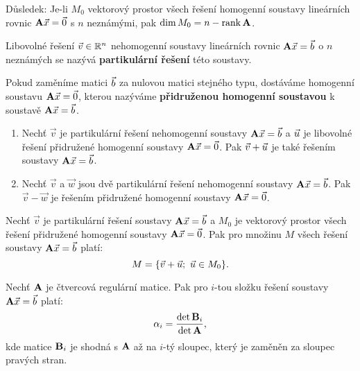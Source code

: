Důsledek: Je-li $M_0$ vektorový prostor všech řešení homogenní soustavy lineárních rovnic $\mathbf{A}\vec{x}=\vec{0}$ s $n$ neznámými, pak $\dim M_0=n-\operatorname{rank}\mathbf{A}$.
  
\begin{df}
Libovolné řešení $\vec v\in\mathbb R^n$ nehomogenní soustavy lineárních rovnic $\mathbf{A}\vec{x}=\vec{b}$ o $n$ neznámých se nazývá {\bf partikulární řešení} této soustavy.

Pokud zaměníme matici $\vec{b}$ za nulovou matici stejného typu, dostáváme homogenní soustavu $\mathbf{A}\vec{x}=\vec{0}$, kterou nazýváme {\bf přidruženou homogenní soustavou} k soustavě $\mathbf{A}\vec{x}=\vec{b}$.
\end{df}
  
\begin{veta}
\begin{enumerate}
\item Nechť $\vec v$ je partikulární řešení nehomogenní soustavy $\mathbf{A}\vec{x}=\vec{b}$ a $\vec{u}$ je libovolné řešení přidružené homogenní soustavy $\mathbf{A}\vec{x}=\vec{0}$.
Pak $\vec v+\vec{u}$ je také řešením soustavy $\mathbf{A}\vec{x}=\vec{b}$.
\item Nechť $\vec v$ a $\vec w$ jsou dvě partikulární řešení nehomogenní soustavy $\mathbf{A}\vec{x}=\vec{b}$.
Pak $\vec v-\vec w$ je řešením přidružené homogenní soustavy $\mathbf{A}\vec{x}=\vec{0}$.
\end{enumerate}
\end{veta}
  
\begin{veta}
Nechť $\vec v$ je partikulární řešení soustavy $\mathbf{A}\vec{x}=\vec{b}$ a $M_0$ je vektorový prostor všech řešení přidružené homogenní soustavy $\mathbf{A}\vec{x}=\vec{0}$.
Pak pro množinu $M$ všech řešení soustavy $\mathbf{A}\vec{x}=\vec{b}$ platí:
$$ M=\{\vec v+\vec{u};~\vec{u}\in M_0\}. $$
\end{veta}
  
\begin{veta}
Nechť $\mathbf{A}$ je čtvercová regulární matice.
Pak pro $i$-tou složku řešení soustavy $\mathbf{A}\vec{x}=\vec{b}$ platí:
$$ \alpha_i = \frac{\det\mathbf{B}_i}{\det\mathbf{A}}, $$
kde matice $\mathbf{B}_i$ je shodná s $\mathbf{A}$ až na $i$-tý sloupec, který je zaměněn za sloupec pravých stran.
\end{veta}
